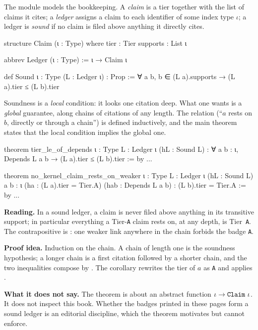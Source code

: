 The module  models the bookkeeping. A
\emph{claim} is a tier together with the list of claims it cites; a \emph{ledger}%
 assigns a claim to each identifier of some index type $\iota$; a
ledger is \emph{sound} if no claim is filed above anything it directly cites.
\begin{leancode}
structure Claim (ι : Type) where
  tier : Tier
  supports : List ι

abbrev Ledger (ι : Type) := ι → Claim ι

def Sound {ι : Type} (L : Ledger ι) : Prop :=
  ∀ a b, b ∈ (L a).supports → (L a).tier ≤ (L b).tier
\end{leancode}
Soundness is a \emph{local} condition: it looks one citation deep. What one wants is a
\emph{global} guarantee, along chains of citations of any length. The relation
 (``$a$ rests on $b$, directly or through a chain'') is defined
inductively, and the main theorem states that the local condition implies the global one.

\begin{leanbox}
\begin{leancode}
theorem tier_le_of_depends {ι : Type} {L : Ledger ι} (hL : Sound L) :
    ∀ {a b : ι}, Depends L a b → (L a).tier ≤ (L b).tier := by ...

theorem no_kernel_claim_rests_on_weaker {ι : Type} {L : Ledger ι}
    (hL : Sound L) {a b : ι} (ha : (L a).tier = Tier.A)
    (hab : Depends L a b) : (L b).tier = Tier.A := by ...
\end{leancode}
\textbf{Reading.} In a sound ledger, a claim is never filed above anything in its transitive
support; in particular everything a Tier-\texttt{A} claim rests on, at any depth, is
Tier~\texttt{A}. The contrapositive is : one weaker link anywhere
in the chain forbids the badge \texttt{A}.

\textbf{Proof idea.} Induction on the chain. A chain of length one is the soundness
hypothesis; a longer chain is a first citation followed by a shorter chain, and the two
inequalities compose by . The corollary rewrites the tier of $a$ as
\texttt{A} and applies .

\textbf{What it does not say.} The theorem is about an abstract function
$\iota\to\lean{Claim}\ \iota$. It does not inspect this book. Whether the badges printed in
these pages form a sound ledger is an editorial discipline, which the theorem motivates but
cannot enforce.
\end{leanbox}

